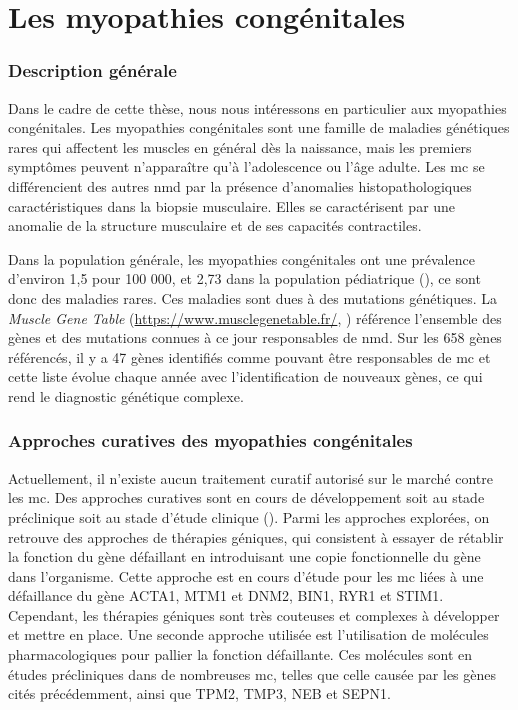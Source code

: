 \section{Les myopathies congénitales}
\subsubsection{Description générale}
Dans le cadre de cette thèse, nous nous intéressons en particulier aux myopathies congénitales. Les myopathies congénitales sont une famille de maladies génétiques rares qui affectent les muscles en général dès la naissance, mais les premiers symptômes peuvent n'apparaître qu'à l'adolescence ou l'âge adulte. Les \gls{mc} se différencient des autres \gls{nmd} par la présence d'anomalies histopathologiques caractéristiques dans la biopsie musculaire. Elles se caractérisent par une anomalie de la structure musculaire et de ses capacités contractiles.

Dans la population générale, les myopathies congénitales ont une prévalence d'environ 1,5 pour 100 000, et 2,73 dans la population pédiatrique (\cite{huang_systematic_2021}), ce sont donc des maladies rares. Ces maladies sont dues à des mutations génétiques. La \textit{Muscle Gene Table} (\href{https://www.musclegenetable.fr/}{https://www.musclegenetable.fr/}, \cite{benarroch_2023_2023}) référence l'ensemble des gènes et des mutations connues à ce jour responsables de \gls{nmd}. Sur les 658 gènes référencés, il y a 47 gènes identifiés comme pouvant être responsables de \gls{mc} et cette liste évolue chaque année avec l'identification de nouveaux gènes, ce qui rend le diagnostic génétique complexe. 

\subsubsection{Approches curatives des myopathies congénitales}
Actuellement, il n'existe aucun traitement curatif autorisé sur le marché contre les \gls{mc}. Des approches curatives sont en cours de développement soit au stade préclinique soit au stade d'étude clinique (\cite{gineste_therapeutic_2023, guan_gene_2016}). Parmi les approches explorées, on retrouve des approches de thérapies géniques, qui consistent à essayer de rétablir la fonction du gène défaillant en introduisant une copie fonctionnelle du gène dans l'organisme. Cette approche est en cours d'étude pour les \gls{mc} liées à une défaillance du gène ACTA1, MTM1 et DNM2, BIN1, RYR1 et STIM1. Cependant, les thérapies géniques sont très couteuses et complexes à développer et mettre en place. Une seconde approche utilisée est l'utilisation de molécules pharmacologiques pour pallier la fonction défaillante. Ces molécules sont en études précliniques dans de nombreuses \gls{mc}, telles que celle causée par les gènes cités précédemment, ainsi que TPM2, TMP3, NEB et SEPN1. 

